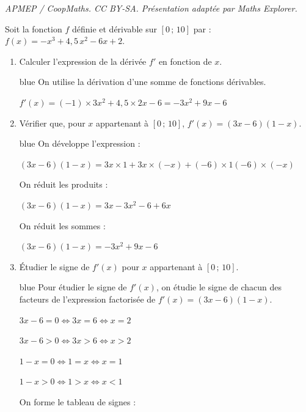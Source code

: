 \documentclass[10pt]{article}
\begin{document}
\noindent\textit{APMEP / CoopMaths. CC BY-SA. Présentation adaptée par Maths Explorer.}\par\medskip
Soit la fonction $f$ définie et dérivable sur $[0\,;\,10]$ par :\quad $f(x)=-x^{3}+4{,}5\,x^{2}-6x+2$.
	
	\begin{enumerate}
		\item Calculer l'expression de la dérivée $f'$ en fonction de $x$.
		
		\begin{color}{blue}
		On utilise la dérivation d'une somme de fonctions dérivables.
		
		$f'(x)=(-1)\times 3x^{2} + 4{,}5\times 2x - 6  = -3x^2 + 9x - 6$
		
		\end{color}
		
		
		\item Vérifier que, pour $x$ appartenant à $[0\,;\,10]$, $f'(x)=(3x-6)(1-x)$.

		\begin{color}{blue}
		On développe l'expression :
		
		\(
		(3x-6)(1-x) = 3x\times 1 +3x\times (-x) + (-6)\times 1 (-6)\times (-x) 
		\)
		
		On réduit les produits :
		
		\(
		(3x-6)(1-x) = 3x -3x^2 - 6 + 6x 
		\)
		
		
		On réduit les sommes :

		\(
		(3x-6)(1-x) = -3x^2 + 9x - 6  
		\)
		
				
		\end{color}
		
		\item Étudier le signe de $f'(x)$ pour $x$ appartenant à $[0\,;\,10]$.
		
		\begin{color}{blue}
		Pour étudier le signe de $f'(x)$, on étudie le signe de chacun des facteurs de l'expression factorisée de $f'(x)=(3x-6)(1-x)$.
		
		$3x - 6 = 0 \iff 3x = 6 \iff x = 2$
		
		$3x - 6 > 0 \iff 3x > 6 \iff x > 2$
		
		$1 - x = 0 \iff 1 = x \iff x = 1$
		
		$1 - x > 0 \iff 1 > x \iff x < 1$
		
		On forme le tableau de signes :
		
		
		\begin{center}
		\end{center}
		

\end{color}
\end{enumerate}
\end{document}
